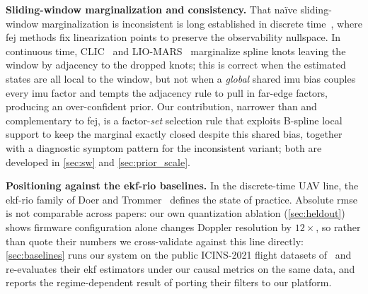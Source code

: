 \textbf{Sliding-window marginalization and consistency.}
That na\"ive sliding-window marginalization is inconsistent is long
established in discrete time~\cite{dongsi2012consistency}, where \ac{fej}
methods fix linearization points to preserve the observability nullspace.
In continuous time, CLIC~\cite{lv2023clic} and
LIO-MARS~\cite{quenzel2025liomars} marginalize spline knots leaving the
window by adjacency to the dropped knots; this is correct when the
estimated states are all local to the window, but not when a
\emph{global} shared \ac{imu} bias couples every \ac{imu} factor and
tempts the adjacency rule to pull in far-edge factors, producing an
over-confident prior.  Our contribution, narrower than and complementary
to \ac{fej}, is a factor-\emph{set} selection rule that exploits B-spline
local support to keep the marginal exactly closed despite this shared
bias, together with a diagnostic symptom pattern for the inconsistent
variant; both are developed in \autoref{sec:sw} and
\autoref{sec:prior_scale}.

\textbf{Positioning against the \ac{ekf}-\ac{rio} baselines.}
In the discrete-time UAV line, the \ac{ekf}-\ac{rio} family of Doer and
Trommer~\cite{doer2020ekf} defines the state of practice.
Absolute \ac{rmse} is not comparable across papers: our own quantization
ablation (\autoref{sec:heldout}) shows firmware configuration alone
changes Doppler resolution by $12\times$, so rather than quote their
numbers we cross-validate against this line directly:
\autoref{sec:baselines} runs our system on the
public ICINS-2021 flight datasets of~\cite{doer2021yrio} and re-evaluates
their \ac{ekf} estimators under our causal metrics on the same data, and
reports the regime-dependent result of porting their filters to our
platform.
